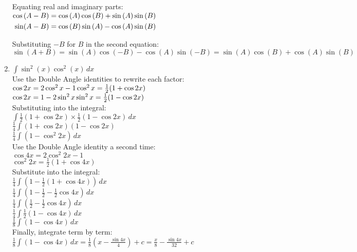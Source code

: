 \documentclass[../main.tex]{subfiles}
\begin{document}
\begin{enumerate}
    Equating real and imaginary parts:\\
    $
    \!
    \begin{aligned}[t]
    \cos{(A-B)}
    &=\cos{(A)}\cos{(B)}+\sin{(A)}\sin{(B)}\\
    \sin(A-B)
    &=\cos{(B)}\sin{(A)}-\cos{(A)}\sin{(B)}\\
    \end{aligned}\\
    $

    Substituting \(-B\) for \(B\) in the second equation:\\
    \(\sin{(A+B)}=\sin{(A)}\cos{(-B)}-\cos{(A)}\sin{(-B)}=\sin{(A)}\cos{(B)}+\cos{(A)}\sin{(B)}\)\\

    \item 
    \(\int \sin^2{(x)}\cos^2{(x)} \,dx\)\\
    Use the Double Angle identities to rewrite each factor:\\
    \(\cos{2x}=2\cos^2{x}-1\\
    \cos^2{x}=\frac{1}{2}(1+\cos{2x})\)\\
    \(\cos{2x}=1-2\sin^2{x}\\
    \sin^2{x}=\frac{1}{2}(1-\cos{2x})\)\\

    Substituting into the integral:\\
    \(\int \frac{1}{2}(1+\cos{2x}) \times \frac{1}{2}(1-\cos{2x}) \,dx\)\\
    \(\frac{1}{4}\int (1+\cos{2x})(1-\cos{2x}) \,\)\\
    \(\frac{1}{4}\int (1-\cos^2{2x}) \,dx\)\\

    Use the Double Angle identity a second time:\\
    \(\cos{4x}=2\cos^2{2x}-1\)\\
    \(\cos^2{2x}=\frac{1}{2}(1+\cos{4x})\)\\

    Substitute into the integral:\\
    \(\frac{1}{4}\int (1-\frac{1}{2}(1+\cos{4x}))\,dx\)\\
    \(\frac{1}{4}\int (1-\frac{1}{2}-\frac{1}{2}\cos{4x})\,dx\)\\
    \(\frac{1}{4}\int (\frac{1}{2}-\frac{1}{2}\cos{4x})\,dx\)\\
    \(\frac{1}{4}\int \frac{1}{2}(1-\cos{4x})\,dx\)\\
    \(\frac{1}{8}\int (1-\cos{4x})\,dx\)\\

    Finally, integrate term by term:\\
    \(\frac{1}{8}\int (1-\cos{4x})\,dx=\frac{1}{8}(x-\frac{\sin{4x}}{4})+c=\frac{x}{8}-\frac{\sin{4x}}{32}+c\)\\
    
    \end{enumerate}
\end{document}
